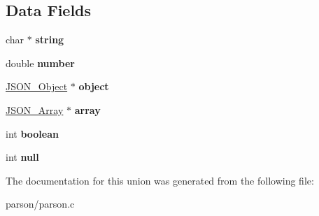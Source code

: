 \subsection*{Data Fields}
\begin{DoxyCompactItemize}
\item 
\hypertarget{unionjson__value__value_aed1cfb225a5fb77461e7972691e68a72}{char $\ast$ {\bfseries string}}\label{unionjson__value__value_aed1cfb225a5fb77461e7972691e68a72}

\item 
\hypertarget{unionjson__value__value_a01b4671c6b7cc8f831c951c000a37735}{double {\bfseries number}}\label{unionjson__value__value_a01b4671c6b7cc8f831c951c000a37735}

\item 
\hypertarget{unionjson__value__value_adf328f722d277e72d53cb9ba3dc24b89}{\hyperlink{structjson__object__t}{J\-S\-O\-N\-\_\-\-Object} $\ast$ {\bfseries object}}\label{unionjson__value__value_adf328f722d277e72d53cb9ba3dc24b89}

\item 
\hypertarget{unionjson__value__value_a22a00745be0ac60b4123d170b7197c7b}{\hyperlink{structjson__array__t}{J\-S\-O\-N\-\_\-\-Array} $\ast$ {\bfseries array}}\label{unionjson__value__value_a22a00745be0ac60b4123d170b7197c7b}

\item 
\hypertarget{unionjson__value__value_afc58e0c0df35925913174accbf1114cb}{int {\bfseries boolean}}\label{unionjson__value__value_afc58e0c0df35925913174accbf1114cb}

\item 
\hypertarget{unionjson__value__value_a76be38e21d5d7e1dc6da841571762c4d}{int {\bfseries null}}\label{unionjson__value__value_a76be38e21d5d7e1dc6da841571762c4d}

\end{DoxyCompactItemize}


The documentation for this union was generated from the following file\-:\begin{DoxyCompactItemize}
\item 
parson/parson.\-c\end{DoxyCompactItemize}
